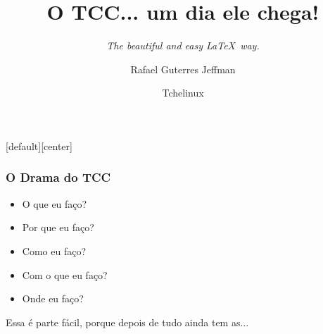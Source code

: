 


\title[]{O TCC... um dia ele chega!}
\subtitle[]{\emph{The beautiful and easy \LaTeX\ way.}}
\author[]{Rafael Guterres Jeffman}
\institute[]{}
\date{Tchelinux}


\hypersetup{pdfpagemode=FullScreen}

\beamertemplatenavigationsymbolsempty

[default][center]




\begin{frame}
    \titlepage
\end{frame}

\begin{frame}[c]
    \frametitle{O Drama do TCC}
    \begin{itemize}
    \item{O que eu faço?}
    \item{Por que eu faço?}
    \item{Como eu faço?}
    \item{Com o que eu faço?}
    \item{Onde eu faço?}
    \end{itemize}
\end{frame}

\begin{frame}
    \vfill
    \begin{center}
    \large Essa é parte fácil, porque depois de tudo ainda tem as...
    \end{center}
\end{frame}

